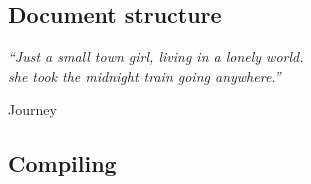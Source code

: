 \begin{refsection}

\chapter{Document structure} \label{chapter:structure}
\pagestyle{chapter}

\setlength{\epigraphwidth}{3in} 
\epigraph{\textit{``Just a small town girl, living in a lonely world. \\
                    she took the midnight train going anywhere.''}}{Journey} 
\vspace{3em} 

\section{Compiling}

\clearpage
\pagestyle{biblio}
\printbibliography 

\end{refsection}